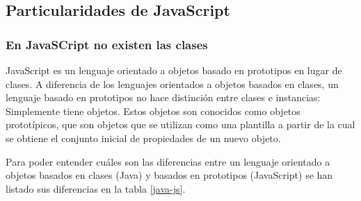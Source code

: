 \subsection{Particularidades de JavaScript}
\subsubsection{En JavaSCript no existen las clases}
JavaScript es un lenguaje orientado a objetos basado en prototipos en lugar de clases. A diferencia de los lenguajes orientados a objetos basados en clases, un lenguaje basado en prototipos no hace distinción entre clases e instancias: Simplemente tiene objetos. Estos objetos son conocidos como objetos prototípicos, que son objetos que se utilizan como una plantilla a partir de la cual se obtiene el conjunto inicial de propiedades de un nuevo objeto\cite{fernandomonteiro2014}.


Para poder entender cuáles son las diferencias entre un lenguaje orientado a objetos basados en clases (Java) y basados en prototipos (JavaScript) se han listado sus diferencias en la tabla \ref{java-js}.


